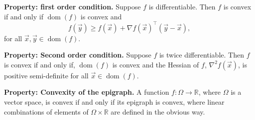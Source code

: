 \documentclass[10pt]{article}
\newcommand{\RR}{\mathbb{R}}
\DeclareMathOperator{\dom}{dom}
\begin{document}
\textbf{Property: first order condition.} Suppose $f$ is differentiable. Then $f$ is convex if and only if $\dom(f)$ is convex and
\begin{equation}
    f(\vec{y}) \geq f(\vec{x}) + \nabla f(\vec{x})^\top (\vec{y} - \vec{x}),
\end{equation}
for all $\vec{x}, \vec{y} \in \dom(f)$.

\textbf{Property: Second order condition.} Suppose $f$ is twice differentiable. Then $f$ is convex if and only if, $\dom(f)$ is convex and the Hessian of $f$, $\nabla^2 f(\vec{x})$, is positive semi-definite for all $\vec{x} \in \dom(f)$.

\textbf{Property: Convexity of the epigraph.} A function $f\colon \Omega \to \RR$, where $\Omega$ is a vector space, is convex if and only if its epigraph is convex, where linear combinations of elements of $\Omega \times \RR$ are defined in the obvious way.
\end{document}
